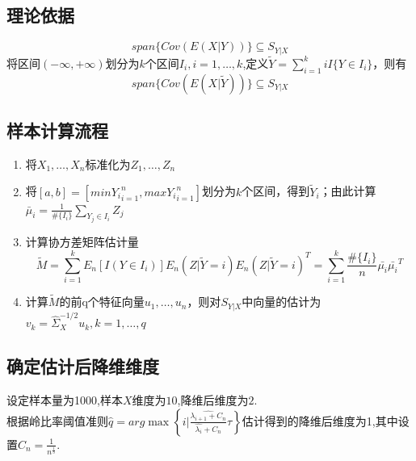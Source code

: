 \subsection{理论依据}
    \begin{equation*}
        span\{Cov(E(X|Y))\}\subseteq S_{Y|X}
    \end{equation*}
    将区间$(-\infty,+\infty)$划分为$k$个区间$I_i, i=1,\dots,k$,定义$\widetilde{Y}=\sum_{i=1}^kiI\{Y\in I_i\}$，则有
    \begin{equation*}
        span\{Cov(E(X|\widetilde{Y}))\}\subseteq S_{Y|X}
    \end{equation*}
\subsection{样本计算流程}
    \begin{enumerate}
        \item 将$X_1,\dots,X_n$标准化为$Z_1,\dots,Z_n$
        \item 将$[a,b]=[min{Y_i}_{i=1}^n,max{Y_i}_{i=1}^n]$划分为$k$个区间，得到$\widetilde{Y}_i$；由此计算$\bar{\mu}_i=\frac{1}{\#\{I_i\}}\sum_{Y_j\in I_i}Z_j$
        \item 计算协方差矩阵估计量$$\widetilde{M}=\sum_{i=1}^kE_n[I(Y\in I_i)] E_n(Z|\widetilde{Y}=i) E_n(Z|\widetilde{Y}=i)^T=\sum_{i=1}^k\frac{\#\{I_i\}}{n}\bar{\mu_i}\bar{\mu_i}^T$$
        \item 计算$\widetilde{M}$的前q个特征向量$u_1,\dots,u_n$，则对$S_{Y|X}$中向量的估计为$v_k=\hat{\Sigma}_{X}^{-1/2}u_k,k=1,\dots,q$
    \end{enumerate}

\subsection{确定估计后降维维度}
    设定样本量为1000,样本$X$维度为$10$,降维后维度为$2$.\\
    根据岭比率阈值准则$\hat{q} = arg\max\left\{i|\frac{\hat{\lambda_{i+1}+C_n}}{\hat{\lambda_i}+C_n}\tau\right\}$估计得到的降维后维度为1,其中设置$C_n = \frac{1}{n^\frac{1}{3} }$.

